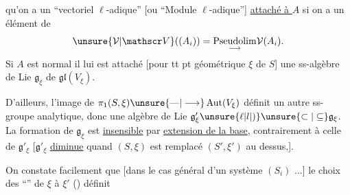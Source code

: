 qu'on a un  ``vectoriel $\ell$-adique'' [ou ``Module $\ell$-adique''] \uline{attaché à $A$} si on a un élément de
\[
\unsure{\mathcal V|\mathscr V}((A_i))=\underset{\longrightarrow}{\operatorname{Pseudolim}}\mathcal V(A_i).
\]
Si $A$ est normal  il lui est attaché   [pour tt pt géométrique $\xi$ de $S$] une ss-algèbre de Lie $\mathfrak g_\xi$ de $\mathfrak{gl}(V_\xi)$.

D'ailleurs, l'image de $\pi_1(S,\xi)\unsure{\text{---}|\longrightarrow}\operatorname{Aut}(V_\xi)$ définit un autre ss-groupe analytique, donc une algèbre de Lie $\mathfrak g'_\xi\unsure{\ell|l|)}\unsure{\subset|\subseteq}\mathfrak g_\xi$. La formation de $\mathfrak g_\xi$ est  \uline{insensible} par \uline{extension  de la base}, contrairement à celle de $\mathfrak g'_\xi$ [$\mathfrak g'_\xi$ \uline{diminue} quand $(S,\xi)$ est remplacé  $(S',\xi')$ au dessus,].

On constate facilement que [dans le cas général d'un système $(S_i)$ ...]  le choix des  ``'' de $\xi$ à $\xi'$  () définit
